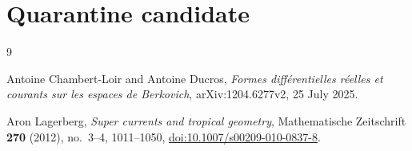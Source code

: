 \documentclass[11pt]{article}
\begin{document}
\section*{Quarantine candidate}




\begin{sloppypar}
\begin{thebibliography}{9}
\raggedright

Antoine Chambert-Loir and Antoine Ducros,
\emph{Formes diff\'erentielles r\'eelles et courants sur les espaces de
Berkovich}, arXiv:1204.6277v2, 25 July 2025.

Aron Lagerberg,
\emph{Super currents and tropical geometry},
Mathematische Zeitschrift \textbf{270} (2012), no.~3--4, 1011--1050,
\href{https://doi.org/10.1007/s00209-010-0837-8}
{doi:10.1007/s00209-010-0837-8}.

\end{thebibliography}
\end{sloppypar}
\end{document}
